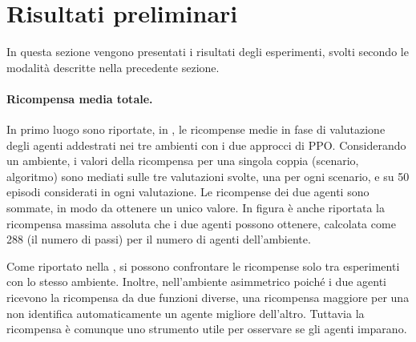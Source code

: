 \section{Risultati preliminari}
\label{sec:5_risultati}

In questa sezione vengono presentati i risultati degli esperimenti, svolti secondo le modalità descritte nella precedente sezione.

\paragraph{Ricompensa media totale.} In primo luogo sono riportate, in , le ricompense medie in fase di valutazione degli agenti addestrati nei tre ambienti con i due approcci di PPO. Considerando un ambiente, i valori della ricompensa per una singola coppia (scenario, algoritmo) sono mediati sulle tre valutazioni svolte, una per ogni scenario, e su 50 episodi considerati in ogni valutazione. Le ricompense dei due agenti sono sommate, in modo da ottenere un unico valore. In figura è anche riportata la ricompensa massima assoluta che i due agenti possono ottenere, calcolata come 288 (il numero di passi) per il numero di agenti dell'ambiente.

Come riportato nella , si possono confrontare le ricompense solo tra esperimenti con lo stesso ambiente. Inoltre, nell'ambiente asimmetrico poiché i due agenti ricevono la ricompensa da due funzioni diverse, una ricompensa maggiore per una non identifica automaticamente un agente migliore dell'altro. Tuttavia la ricompensa è comunque uno strumento utile per osservare se gli agenti imparano.

